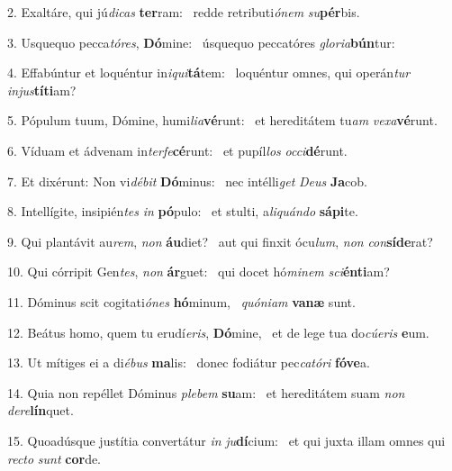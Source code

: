 2. Exaltáre, qui jú\textit{di}\textit{cas} \textbf{ter}ram: \ast\  redde retributi\textit{ó}\textit{nem} \textit{su}\textbf{pér}bis.\

3. Usquequo pecca\textit{tó}\textit{res}, \textbf{Dó}mine: \ast\  úsquequo peccatóres \textit{glo}\textit{ri}\textit{a}\textbf{bún}tur:\

4. Effabúntur et loquéntur in\textit{i}\textit{qui}\textbf{tá}tem: \ast\  loquéntur omnes, qui operán\textit{tur} \textit{in}\textit{jus}\textbf{tí}\textbf{ti}am?\

5. Pópulum tuum, Dómine, humi\textit{li}\textit{a}\textbf{vé}runt: \ast\  et hereditátem tu\textit{am} \textit{ve}\textit{xa}\textbf{vé}runt.\

6. Víduam et ádvenam in\textit{ter}\textit{fe}\textbf{cé}runt: \ast\  et pupíl\textit{los} \textit{oc}\textit{ci}\textbf{dé}runt.\

7. Et dixérunt: Non vi\textit{dé}\textit{bit} \textbf{Dó}minus: \ast\  nec intélli\textit{get} \textit{De}\textit{us} \textbf{Ja}cob.\

8. Intellígite, insipién\textit{tes} \textit{in} \textbf{pó}pulo: \ast\  et stulti, a\textit{li}\textit{quán}\textit{do} \textbf{sá}\textbf{pi}te.\

9. Qui plantávit au\textit{rem}, \textit{non} \textbf{áu}diet? \ast\  aut qui finxit ócu\textit{lum}, \textit{non} \textit{con}\textbf{sí}\textbf{de}rat?\

10. Qui córripit Gen\textit{tes}, \textit{non} \textbf{ár}guet: \ast\  qui docet hó\textit{mi}\textit{nem} \textit{sci}\textbf{én}\textbf{ti}am?\

11. Dóminus scit cogitati\textit{ó}\textit{nes} \textbf{hó}minum, \ast\  \textit{quón}\textit{i}\textit{am} \textbf{va}\textbf{næ} sunt.\

12. Beátus homo, quem tu erudí\textit{e}\textit{ris}, \textbf{Dó}mine, \ast\  et de lege tua do\textit{cú}\textit{e}\textit{ris} \textbf{e}um.\

13. Ut mítiges ei a di\textit{é}\textit{bus} \textbf{ma}lis: \ast\  donec fodiátur pec\textit{ca}\textit{tó}\textit{ri} \textbf{fó}\textbf{ve}a.\

14. Quia non repéllet Dóminus \textit{ple}\textit{bem} \textbf{su}am: \ast\  et hereditátem suam \textit{non} \textit{de}\textit{re}\textbf{lín}quet.\

15. Quoadúsque justítia convertátur \textit{in} \textit{ju}\textbf{dí}cium: \ast\  et qui juxta illam omnes qui \textit{rec}\textit{to} \textit{sunt} \textbf{cor}de.\

